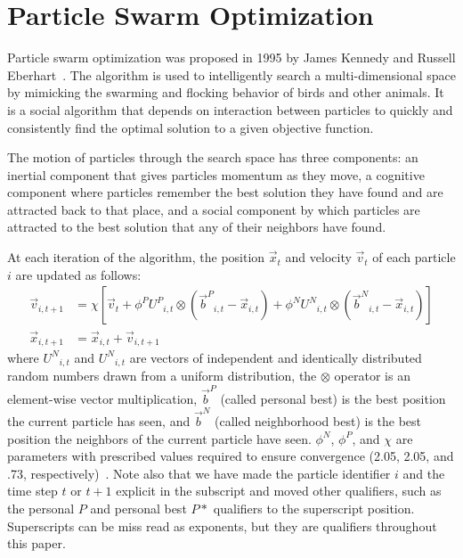 \documentclass[journal,letterpaper]{IEEEtran}
\providecommand{\pers}{\ensuremath{P}}
\providecommand{\neigh}{\ensuremath{N}}
\providecommand{\nURand}{\ensuremath{U^\neigh}}
\providecommand{\pURand}{\ensuremath{U^\pers}}
\providecommand{\ppos}{\ensuremath{\Vec{x}}}
\providecommand{\pvel}{\ensuremath{\Vec{v}}}
\providecommand{\nbest}{\ensuremath{\Vec{b}^\neigh}}
\providecommand{\pbest}{\ensuremath{\Vec{b}^\pers}}
\providecommand{\constriction}{\ensuremath{\chi}}
\providecommand{\ncoeff}{\ensuremath{\phi^\neigh}}
\providecommand{\pcoeff}{\ensuremath{\phi^\pers}}
\begin{document}
\section{Particle Swarm Optimization}
\label{sec:pso}

Particle swarm optimization was proposed in 1995 by James Kennedy and Russell
Eberhart~\cite{kennedy-icnn95}.  The algorithm is used to intelligently search
a multi-dimensional space by mimicking the swarming and flocking behavior of
birds and other animals. It is a social algorithm that depends on interaction
between particles to quickly and consistently find the optimal solution to a
given objective function.

The motion of particles through the search space has three components: an
inertial component that gives particles momentum as they move, a cognitive
component where particles remember the best solution they have found and are
attracted back to that place, and a social component by which particles are
attracted to the best solution that any of their neighbors have found.

At each iteration of the algorithm, the position $\ppos_t$ and velocity
$\pvel_t$ of each particle $i$ are updated as follows:
\begin{align}
\label{eq:velupdate}
	\pvel_{i,t+1} &=
		\constriction \left[ \pvel_t +
			\pcoeff\pURand_{i,t}\otimes(\pbest_{i,t} - \ppos_{i,t}) +
			\ncoeff\nURand_{i,t}\otimes(\nbest_{i,t} - \ppos_{i,t})
		\right] \\
\label{eq:posupdate}
	\ppos_{i,t+1} &= \ppos_{i,t} + \pvel_{i,t+1}
\end{align}
where \( \nURand_{i,t} \) and \( \nURand_{i,t} \) are vectors of independent
and identically distributed random numbers drawn from a uniform
distribution, the \( \otimes \) operator is an element-wise vector
multiplication, $\pbest$ (called personal best) is the best position the
current particle has seen, and $\nbest$ (called neighborhood best) is the best
position the neighbors of the current particle have seen.  \( \ncoeff \), \(
\pcoeff \), and \( \constriction \) are parameters with prescribed values
required to ensure convergence (2.05, 2.05, and .73,
respectively)~\cite{clerc-tec02}. Note also that we have made the particle identifier $i$
and the time step $t$ or $t+1$ explicit in the subscript and moved other qualifiers,
such as the personal $\pers$ and personal best $\pers*$ qualifiers to the superscript position.
Superscripts can be miss read as exponents, but they are qualifiers throughout this paper.
\end{document}
